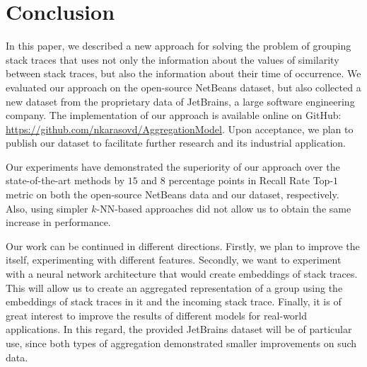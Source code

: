 \section{Conclusion}\label{sec:conclusion}
In this paper, we described a new approach for solving the problem of grouping stack traces that uses not only the information about the values of similarity between stack traces, but also the information about their time of occurrence.
We evaluated our approach on the open-source NetBeans dataset, but also collected a new dataset from the proprietary data of JetBrains, a large software engineering company.
The implementation of our approach is available online on GitHub: \url{https://github.com/nkarasovd/AggregationModel}.
Upon acceptance, we plan to publish our dataset to facilitate further research and its industrial application.

Our experiments have demonstrated the superiority of our approach over the state-of-the-art methods by $15$ and $8$ percentage points in Recall Rate Top-$1$ metric on both the open-source NetBeans data and our dataset, respectively.
Also, using simpler $k$-NN-based approaches did not allow us to obtain the same increase in performance. 

Our work can be continued in different directions.
Firstly, we plan to improve the \ag itself, experimenting with different features.
Secondly, we want to experiment with a neural network architecture that would create embeddings of stack traces. This will allow us to create an aggregated representation of a group using the embeddings of stack traces in it and the incoming stack trace.
Finally, it is of great interest to improve the results of different models for real-world applications.
In this regard, the provided JetBrains dataset will be of particular use, since both types of aggregation demonstrated smaller improvements on such data.